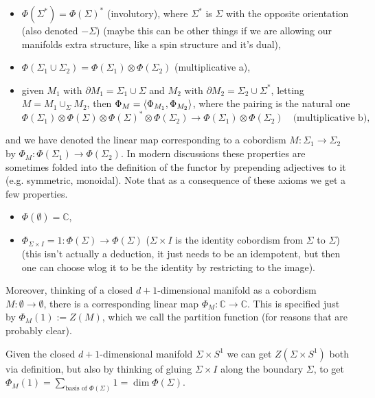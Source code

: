 \documentclass{article}
\begin{document}
\begin{itemize}
	\item $\Phi(\Sigma^\ast) = \Phi(\Sigma)^\ast$ (involutory), where $\Sigma^\ast$ is $\Sigma$ with the opposite orientation (also denoted $-\Sigma$) (maybe this can be other things if we are allowing our manifolds extra structure, like a spin structure and it's dual),
	\item $\Phi(\Sigma_1 \cup \Sigma_2) = \Phi(\Sigma_1) \otimes \Phi(\Sigma_2)$ (multiplicative  a),
	\item  given $M_1$ with $\partial M_1 = \Sigma_1 \cup \Sigma$ and $M_2$ with $\partial M_2 = \Sigma_2 \cup \Sigma^\ast$, letting $M = M_1 \cup_{\Sigma} M_2$, then $\Phi_M = \left\langle \Phi_{M_1}, \Phi_{M_2} \right\rangle$, where the pairing is the natural one 
	\[
	\Phi(\Sigma_1) \otimes \Phi(\Sigma) \otimes \Phi(\Sigma)^\ast \otimes \Phi(\Sigma_2) \to \Phi(\Sigma_1) \otimes \Phi(\Sigma_2) \quad \text{(multiplicative b)},
	\]
\end{itemize} 

and we have denoted the linear map corresponding to a cobordism $M : \Sigma_1 \to \Sigma_2$ by $\Phi_M : \Phi(\Sigma_1) \to \Phi(\Sigma_2)$. In modern discussions these properties are sometimes folded into the definition of the functor by prepending adjectives to it (e.g. symmetric, monoidal). Note that as a consequence of these axioms we get a few properties. 

\begin{itemize}
	\item $\Phi(\emptyset) = \mathbb{C}$,
	\item $\Phi_{\Sigma \times I} = 1 : \Phi(\Sigma) \to \Phi(\Sigma)$ ($\Sigma \times I$ is the identity cobordism from $\Sigma$ to $\Sigma$) (this isn't actually a deduction, it just needs to be an idempotent, but then one can choose wlog it to be the identity by restricting to the image). 
\end{itemize}
Moreover, thinking of a closed $d+1$-dimensional manifold as a cobordism $M : \emptyset \to \emptyset$, there is a corresponding linear map $\Phi_M : \mathbb{C} \to \mathbb{C}$. This is specified just by $\Phi_M(1) := Z(M)$, which we call the partition function (for reasons that are probably clear). 

Given the closed $d+1$-dimensional manifold $\Sigma \times S^1$ we can get $Z(\Sigma \times S^1)$ both via definition, but also by thinking of gluing $\Sigma \times I$ along the boundary $\Sigma$, to get $\Phi_M(1) = \sum_{\text{basis of $\Phi(\Sigma)$}} 1 = \dim \Phi(\Sigma)$. 
\end{document}
